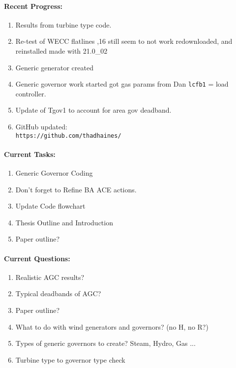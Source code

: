 \documentclass[12pt]{article}
\begin{document}
\begin{multicols}{2}
\raggedright
	\paragraph{Recent Progress:}
	\begin{enumerate}
		\item Results from turbine type code.
		\item Re-test of WECC flatlines 
			,16 still seem to not work
			\subitem redownloaded, and reinstalled
			\subitem made with 21.0\_02

		\item Generic generator created
		\item Generic governor work started
			\subitem got gas params from Dan
			\subitem \verb|lcfb1| = load controller.
			
		\item Update of Tgov1 to account for area gov deadband.


		\item GitHub updated:\\
		\verb|https://github.com/thadhaines/|
		
	\end{enumerate}
\paragraph{Current Tasks:}
	\begin{enumerate}
	
		\item Generic Governor Coding
		\item Don't forget to Refine BA ACE actions.
		\item Update Code flowchart%
		\item Thesis Outline and Introduction 
		\item Paper outline?
		

	\end{enumerate}

	\paragraph{Current Questions:}
	\begin{enumerate}
	\item Realistic AGC results?
	\item Typical deadbands of AGC? 
	\item Paper outline?
	\item What to do with wind generators and governors? (no H, no R?)
	\item Types of generic governors to create? Steam, Hydro, Gas ...
	\item Turbine type to governor type check
	

\end{enumerate}
\end{multicols}
\end{document}
